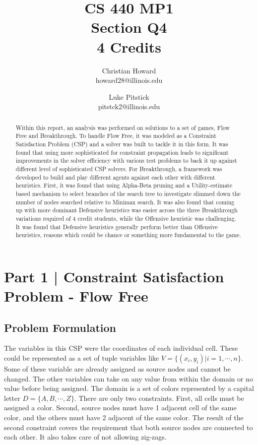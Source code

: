 \documentclass{article}[12pt]
\title{CS 440 MP1 \\ Section Q4 \\ 4 Credits}
\author{
Christian Howard \\ howard28@illinois.edu
\and
Luke Pitstick \\ pitstck2@illinois.edu
}
\date{} %
\begin{document}
   
   \maketitle
   \begin{abstract}
   Within this report, an analysis was performed on solutions to a set of games, Flow Free and Breakthrough. To handle Flow Free, it was modeled as a Constraint Satisfaction Problem (CSP) and a solver was built to tackle it in this form. It was found that using more sophisticated for constraint propagation leads to significant improvements in the solver efficiency with various test problems to back it up against different level of sophisticated CSP solvers. For Breakthrough, a framework was developed to build and play different agents against each other with different heuristics. First, it was found that using Alpha-Beta pruning and a Utility-estimate based mechanism to select branches of the search tree to investigate slimmed down the number of nodes searched relative to Minimax search. It was also found that coming up with more dominant Defensive heuristics was easier across the three Breakthrough variations required of 4 credit students, while the Offensive heuristic was challenging. It was found that Defensive heuristics generally perform better than Offensive heuristics, reasons which could be chance or something more fundamental to the game.
   \end{abstract}
   \newpage
   
   \tableofcontents
   \newpage
   
   \section{Part 1 | Constraint Satisfaction Problem - Flow Free}
   \subsection{Problem Formulation}
   The variables in this CSP were the coordinates of each individual cell. These could be represented as a set of tuple variables like $V = \lbrace (x_i,y_i) | i = 1, \cdots, n \rbrace$. Some of these variable are already assigned as source nodes and cannot be changed. The other variables can take on any value from within the domain or no value before being assigned. The domain is a set of colors represented by a capital letter $D = \lbrace A, B, \cdots, Z \rbrace$. There are only two constraints. First, all cells must be assigned a color. Second, source nodes must have 1 adjacent cell of the same color, and the others must have 2 adjacent of the same color. The result of the second constraint covers the requirement that both source nodes are connected to each other. It also takes care of not allowing zig-zags.
   
\end{document}
